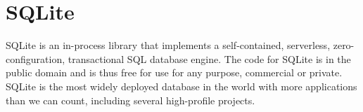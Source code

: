 \section{SQLite}
SQLite is an in-process library that implements a self-contained, serverless,
zero-configuration, transactional SQL database engine. The code for SQLite is
in the public domain and is thus free for use for any purpose, commercial or
private. SQLite is the most widely deployed database in the world with more
applications than we can count, including several high-profile projects\cite{www-sqlite}.
